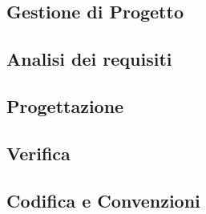 \subsection{Gestione di Progetto}


\subsection{Analisi dei requisiti}


\newpage
\subsection{Progettazione}


\subsection{Verifica}


\subsection{Codifica e Convenzioni}
